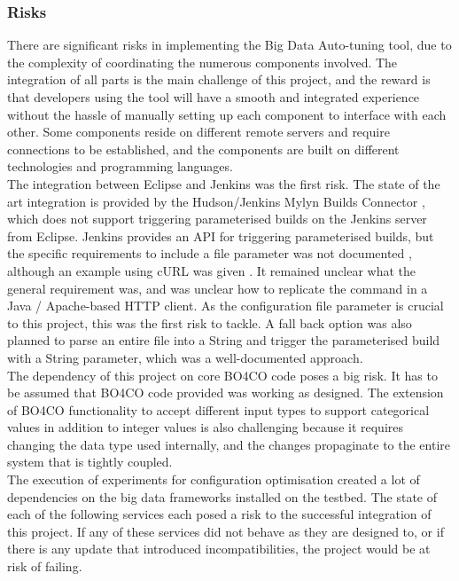 \subsubsection{Risks}
There are significant risks in implementing the Big Data Auto-tuning tool, due to the complexity of coordinating the numerous components involved. The integration of all parts is the main challenge of this project, and the reward is that developers using the tool will have a smooth and integrated experience without the hassle of manually setting up each component to interface with each other. Some components reside on different remote servers and require connections to be established, and the components are built on different technologies and programming languages.\\
The integration between Eclipse and Jenkins was the first risk. The state of the art integration is provided by  the Hudson/Jenkins Mylyn Builds Connector \cite{mylyn}, which does not support triggering parameterised builds on the Jenkins server from Eclipse. Jenkins provides an API for triggering parameterised builds, but the specific requirements to include a file parameter was not documented \cite{pbuild}, although an example using cURL was given \cite{remoteapi}. It remained unclear what the general requirement was, and was unclear how to replicate the command in a Java / Apache-based HTTP client. As the configuration file parameter is crucial to this project, this was the first risk to tackle. A fall back option was also planned to parse an entire file into a String and trigger the parameterised build with a String parameter, which was a well-documented approach. \cite{pbuild}\\
The dependency of this project on core BO4CO code poses a big risk. It has to be assumed that BO4CO code provided was working as designed. The extension of BO4CO functionality to accept different input types to support categorical values in addition to integer values is also challenging because it requires changing the data type used internally, and the changes propaginate to the entire system that is tightly coupled.\\
The execution of experiments for configuration optimisation created a lot of dependencies on the big data frameworks installed on the testbed. The state of each of the following services each posed a risk to the successful integration of this project. If any of these services did not behave as they are designed to, or if there is any update that introduced incompatibilities, the project would be at risk of failing. 
